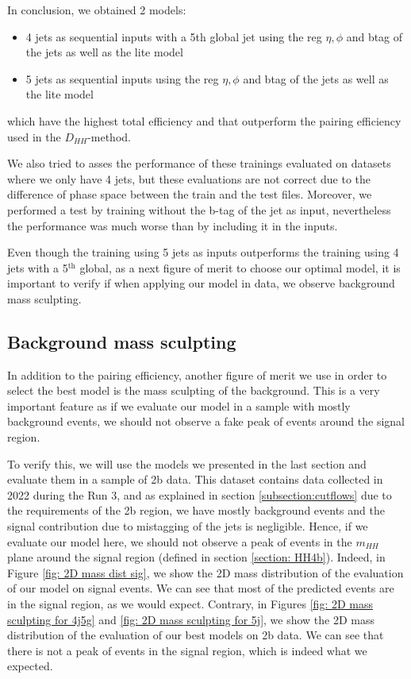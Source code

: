 \vspace{0.2cm}

\noindent In conclusion, we obtained 2 models:

\begin{itemize} [itemsep=0.1em]
    \item 4 jets as sequential inputs with a 5th global jet using the \pt reg $\eta, \phi$ and btag of the jets as well as the lite model
    \item 5 jets as sequential inputs using the \pt reg $\eta, \phi$ and btag of the jets as well as the lite model
\end{itemize}

\noindent which have the highest total efficiency and that outperform the pairing efficiency used in the $D_{HH}$-method.

We also tried to asses the performance of these trainings evaluated on datasets where we only have 4 jets, but these evaluations are not correct due to the difference of phase space between the train and the test files. Moreover, we performed a test by training without the b-tag of the jet as input, nevertheless the performance was much worse than by including it in the inputs.

Even though the training using 5 jets as inputs outperforms the training using 4 jets with a 5$^{\text{th}}$ global, as a next figure of merit to choose our optimal model, it is important to verify if when applying our model in data, we observe background mass sculpting.

\clearpage

\subsection{Background mass sculpting}
In addition to the pairing efficiency, another figure of merit we use in order to select the best model is the mass sculpting of the background. This is a very important feature as if we evaluate our model in a sample with mostly background events, we should not observe a fake peak of events around the signal region. 

To verify this, we will use the models we presented in the last section and evaluate them in a sample of 2b data. This dataset contains data collected in 2022 during the Run 3, and as explained in section \ref{subsection:cutflows} due to the requirements of the 2b region, we have mostly background events and the signal contribution due to mistagging of the jets is negligible. Hence, if we evaluate our model here, we should not observe a peak of events in the $m_{HH}$ plane around the signal region (defined in section \ref{section: HH4b}). Indeed, in Figure \ref{fig: 2D mass dist sig}, we show the 2D mass distribution of the evaluation of our model on signal events. We can see that most of the predicted events are in the signal region, as we would expect. Contrary, in Figures \ref{fig: 2D mass sculpting for 4j5g} and \ref{fig: 2D mass sculpting for 5j}, we show the 2D mass distribution of the evaluation of our best models on 2b data. We can see that there is not a peak of events in the signal region, which is indeed what we expected. 

